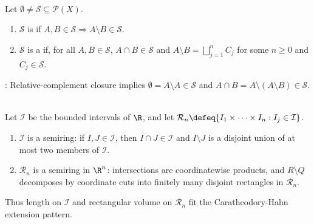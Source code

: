 \begin{definition} \label{def:relative-complements-and-semirings} \\
Let $\emptyset\neq\mathcal{S}\subseteq\mathcal{P}(X)$.
\begin{enumerate}[label=(\roman*)]
\setlength{\itemsep}{0pt}
\item $\mathcal{S}$ is  if $A,B\in\mathcal{S}\Rightarrow A\setminus B\in\mathcal{S}$.
\item $\mathcal{S}$ is a  if, for all $A,B\in\mathcal{S}$, $A\cap B\in\mathcal{S}$ and $A\setminus B=\bigsqcup\limits_{j=1}^{n}C_j$ for some $n\geq0$ and $C_j\in\mathcal{S}$.
\end{enumerate}
: Relative-complement closure implies $\emptyset=A\setminus A\in\mathcal{S}$ and $A\cap B=A\setminus(A\setminus B)\in\mathcal{S}$.
\end{definition}

\begin{example} \label{ex:bounded-interval-products-semirings} \\
Let $\mathcal{I}$ be the bounded intervals of $\R$, and let $\mathcal{R}_n\defeq\{I_1\times\cdots\times I_n:I_j\in\mathcal{I}\}$.
\begin{enumerate}[label=(\roman*)]
\setlength{\itemsep}{0pt}
\item $\mathcal{I}$ is a semiring: if $I,J\in\mathcal{I}$, then $I\cap J\in\mathcal{I}$ and $I\setminus J$ is a disjoint union of at most two members of $\mathcal{I}$.
\item $\mathcal{R}_n$ is a semiring in $\R^n$: intersections are coordinatewise products, and $R\setminus Q$ decomposes by coordinate cuts into finitely many disjoint rectangles in $\mathcal{R}_n$.
\end{enumerate}
Thus length on $\mathcal{I}$ and rectangular volume on $\mathcal{R}_n$ fit the Caratheodory-Hahn extension pattern.
\end{example}

